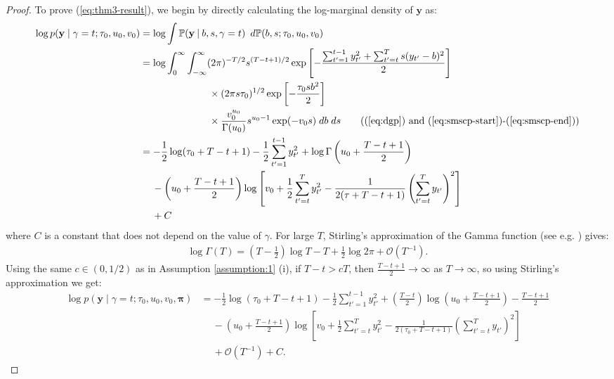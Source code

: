 \begin{proof}
To prove (\ref{eq:thm3-result}), we begin by directly calculating the log-marginal density of $\mathbf{y}$ as: 
\begin{align*}
    \log p(\mathbf{y} \;|\; \gamma = t; \tau_0,u_0,v_0) &= \log \int \mathbb{P}(\mathbf{y} \:|\:b,s,\gamma = t) \:\; d\mathbb{P}(b,s;\tau_0, u_0, v_0) \\
    &= \log \int_{0}^\infty\int_{-\infty}^\infty (2\pi)^{-T/2} s^{(T-t+1)/2} \exp\left[-\frac{\sum_{t'=1}^{t-1} y_{t'}^2 + \sum_{t'=t}^{T} s(y_{t'} - b)^2}{2}\right]  \\
    &\quad\quad\quad\quad\quad\quad\quad  \times (2\pi s\tau_0)^{1/2}\exp\left[-\frac{\tau_0 s b^2}{2}\right] \\
    &\quad\quad\quad\quad\quad\quad\quad  \times\frac{v_0^{u_0}}{\Gamma(u_0)}s^{u_0- 1}\exp(-v_0 s) \; db\; ds \tag{(\ref{eq:dgp}) and (\ref{eq:smscp-start})-(\ref{eq:smscp-end})} \\
    &= -\frac{1}{2}\log(\tau_0 + T - t + 1) - \frac{1}{2}\sum_{t'=1}^{t-1} y_{t'}^2 + \log \Gamma\left(u_0 + \frac{T - t +1}{2}\right) \\
    &\quad\: - \left(u_0 + \frac{T - t +1}{2}\right)\log\left[v_0 +\frac{1}{2}\sum_{t'=t}^T y_{t'}^2 - \frac{1}{2(\tau + T- t +1)}\left(\sum_{t'=t}^T y_{t'}\right)^2 \right] \\
    &\quad\: + C
\end{align*}
where $C$ is a constant that does not depend on the value of $\gamma$. For large $T$, Stirling's approximation of the Gamma function (see e.g. \citealp{abramowitz68}) gives: 
\begin{align*}
    \log \Gamma(T) = \left(T - \frac{1}{2}\right) \log T - T + \frac{1}{2} \log 2 \pi + \mathcal{O}(T^{-1}).
\end{align*}
Using the same $c \in (0,1/2)$ as in Assumption \ref{assumption:1} (i), if $T-t > cT$, then $\frac{T-t+1}{2} \to \infty$ as $T \to \infty$, so using Stirling's approximation we get:
\small
\begin{align*}
    \log p(\mathbf{y} \;|\; \gamma = t; \tau_0,u_0,v_0, \pmb{\pi}) &= -\frac{1}{2}\log(\tau_0 + T - t + 1) - \frac{1}{2}\sum_{t'=1}^{t-1} y_{t'}^2  +\left(\frac{T-t}{2}\right) \log \left(u_0 + \frac{T-t+1}{2}\right) - \frac{T-t+1}{2}  \\
    &\quad\: - \left(u_0 + \frac{T - t +1}{2}\right)\log\left[v_0 +\frac{1}{2}\sum_{t'=t}^T y_{t'}^2 - \frac{1}{2(\tau_0 + T- t +1)}\left(\sum_{t'=t}^T y_{t'}\right)^2 \right] \\
    &\quad\:+ \mathcal{O}(T^{-1}) + C.
\end{align*}

\end{proof}
